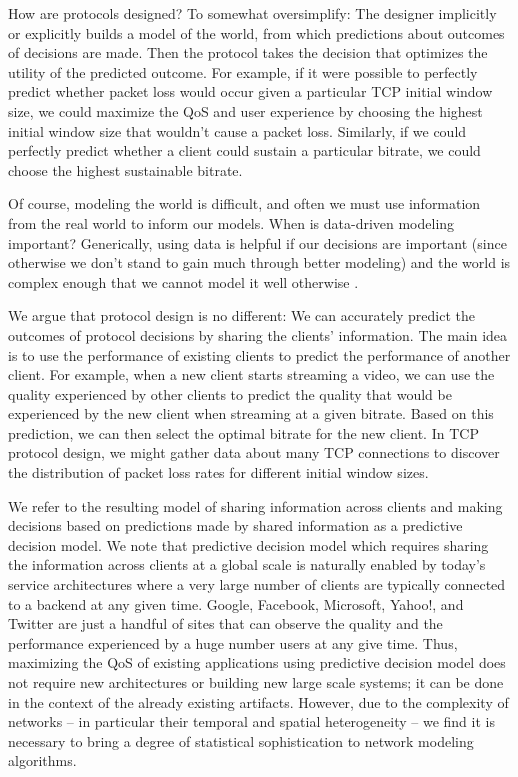 How are protocols designed?  To somewhat oversimplify: The designer implicitly or explicitly builds a model of the world, from which predictions about outcomes of decisions are made.  Then the protocol takes the decision that optimizes the utility of the predicted outcome.  For example, if it were possible to perfectly predict whether packet loss would occur given a particular TCP initial window size, we could maximize the QoS and user experience by choosing the highest initial window size that wouldn't cause a packet loss.  Similarly, if we could perfectly predict whether a client could sustain a particular bitrate, we could choose the highest sustainable bitrate.

Of course, modeling the world is difficult, and often we must use information from the real world to inform our models.  When is data-driven modeling important?  Generically, using data is helpful if our decisions are important (since otherwise we don't stand to gain much through better modeling) and the world is complex enough that we cannot model it well otherwise .

We argue that protocol design is no different: We can accurately predict the outcomes of protocol decisions by sharing the clients' information. The main idea is to use the performance of existing clients to predict the performance of another client. For example, when a new client starts streaming a video, we can use the quality experienced by other clients to predict the quality that would be experienced by the new client when streaming at a given bitrate. Based on this prediction, we can then select the optimal bitrate for the new client.  In TCP protocol design, we might gather data about many TCP connections to discover the distribution of packet loss rates for different initial window sizes.  

We refer to the resulting model of sharing information across clients and making decisions based on predictions made by shared information as a predictive decision model. We note that predictive decision model which requires sharing the information across clients at a global scale is naturally enabled by today's service architectures where a very large number of clients are typically connected to a backend at any given time. Google, Facebook, Microsoft, Yahoo!, and Twitter are just a handful of sites that can observe the quality and the performance experienced by a huge number users at any give time. Thus, maximizing the QoS of existing applications using predictive decision model does not require new architectures or building new large scale systems; it can be done in the context of the already existing artifacts.  However, due to the complexity of networks -- in particular their temporal and spatial heterogeneity -- we find it is necessary to bring a degree of statistical sophistication to network modeling algorithms.

